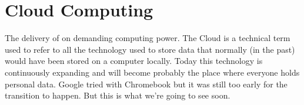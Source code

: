 \documentclass[a4paper,12pt]{book}
\begin{document}



\chapter{Cloud Computing}

The delivery of on demanding computing power. The Cloud is a technical term used to refer to all the technology used to store data that normally (in the past) would have been stored on a computer locally. Today this technology is continuously expanding and will become probably the place where everyone holds personal data. Google tried with Chromebook but it was still too early for the transition to happen. But this is what we're going to see soon.
\clearpage
\end{document}
